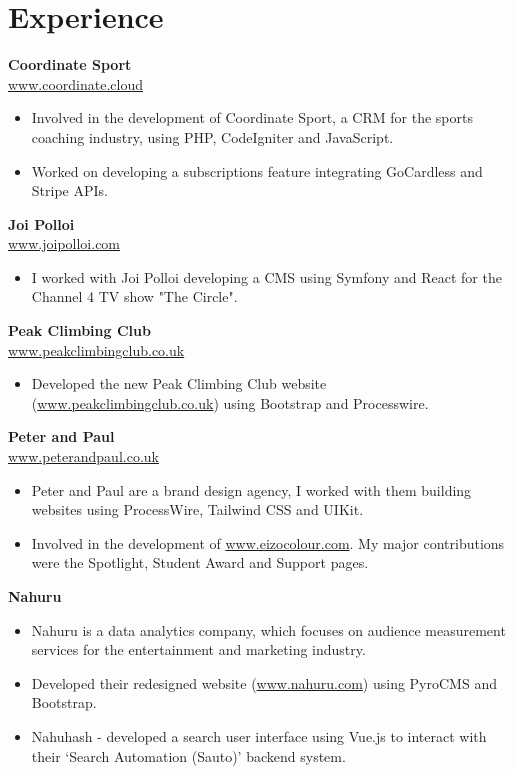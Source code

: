 \documentclass[11pt,a4paper,sans]{moderncv}
\begin{document}
\section{Experience}

\smallskip
\begin{small}
\textbf{Coordinate Sport}\\
\href{https://coordinate.cloud}{www.coordinate.cloud}
	\begin{itemize}%
		\item Involved in the development of Coordinate Sport, a CRM for the sports coaching industry, using PHP, CodeIgniter and JavaScript.
		\item Worked on developing a subscriptions feature integrating GoCardless and Stripe APIs. 
	\end{itemize}
\medskip
\textbf{Joi Polloi}\\
\href{http://www.joipolloi.com}{www.joipolloi.com}
	\begin{itemize}%
		\item I worked with Joi Polloi developing a CMS using Symfony and React for the Channel 4 TV show "The Circle".
	\end{itemize}
	\medskip
 \textbf{Peak Climbing Club}\\
 \href{http://www.peakclimbingclub.co.uk}{www.peakclimbingclub.co.uk}
 	\begin{itemize}%
 		\item Developed the new Peak Climbing Club website (\href{http://www.peakclimbingclub.co.uk}{www.peakclimbingclub.co.uk}) using Bootstrap and Processwire. 
 	\end{itemize}

\textbf{Peter and Paul}\\
\href{http://peterandpaul.co.uk/}{www.peterandpaul.co.uk}
	\begin{itemize}
		\item Peter and Paul are a brand design agency, I worked with them building websites using ProcessWire, Tailwind CSS and UIKit.
		\item Involved in the development of \href{http://www.eizocolour.com}{www.eizocolour.com}. My major contributions were the Spotlight, Student Award and Support pages. 
	\end{itemize}
	\medskip
\textbf{Nahuru}
	\begin{itemize}%
		\item Nahuru is a data analytics company, which focuses on audience measurement services for the entertainment and marketing industry.
		\item Developed their redesigned website (\href{http://www.nahuru.com}{www.nahuru.com}) using PyroCMS and Bootstrap.
		\item Nahuhash - developed a search user interface using Vue.js to interact with their `Search Automation (Sauto)' backend system. 
	\end{itemize}
	\smallskip
\end{small}
\end{document}

